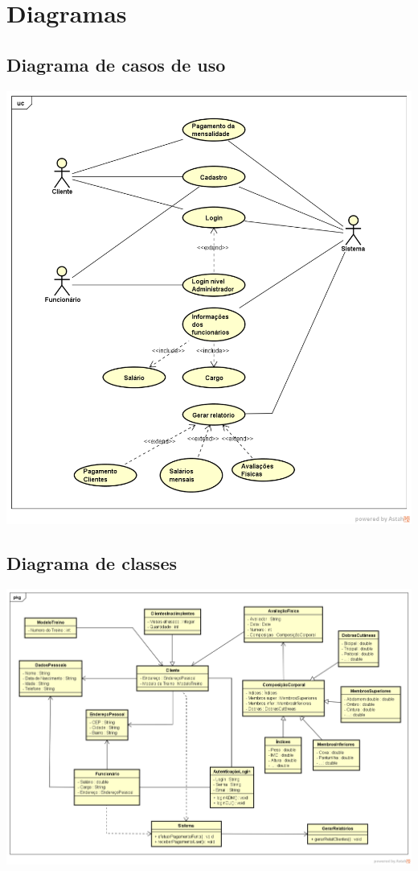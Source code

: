 \section{Diagramas}
\subsection{Diagrama de casos de uso}
\begin{center}
\includegraphics[scale=0.6]{usecaseD.png}
\end{center}

\newpage
\subsection{Diagrama de classes}
\begin{center}
\includegraphics[scale=0.55,angle=90]{classD.png}
\end{center}